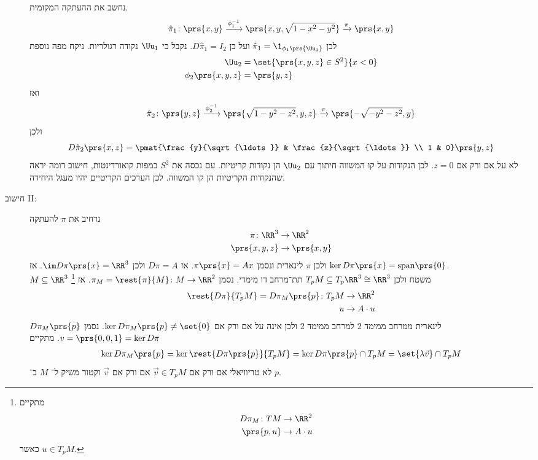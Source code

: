 \documentclass[a4paper,10pt,twoside,openany]{book}
\begin{document}
\begin{example}
\begin{description}
\begin{figure}[ht]
\caption{}
\label{project:shpere-plane-map}
\end{figure}
נחשב את ההעתקה המקומית.
\begin{align*}
\hat{\pi}_1 \colon \prs{x,y} \xrightarrow{\phi_1^{-1}} \prs{x,y,\sqrt{1-x^2-y^2}} \xrightarrow{\pi} \prs{x,y}
\end{align*}
לכן
$\hat{\pi}_1 = \1_{\phi_1\prs{\Uu_1}}$
ועל כן
$D\hat{\pi}_1 = I_2$.
נקבל כי
$\Uu_1$
נקודה רגולריות.
ניקח מפה נוספת
\begin{align*}
\Uu_2 &= \set{\prs{x,y,z}\in S^2}{x < 0} \\
\phi_2\prs{x,y,z} &= \prs{y,z}
\end{align*}
ואז
\[\hat{\pi}_2 \colon \prs{y,z} \xrightarrow{\phi_2^{-1}}\prs{\sqrt{1-y^2-z^2},y,z} \xrightarrow{\pi} \prs{-\sqrt{-y^2-z^2},y}\]
ולכן
\[D\hat{\pi}_2\prs{x,z} = \pmat{\frac{y}{\sqrt{\ldots}} & \frac{z}{\sqrt{\ldots}} \\ 1 & 0}\prs{y,z}\]
לא על אם ורק אם
$z=0$.
לכן הנקודות על קו המשווה חיתוך עם
$\Uu_2$
הן נקודות קריטיות.
עם נכסה את
$S^2$
במפות קואורדינטות, חישוב דומה יראה שהנקודות הקריטיות הן קו המשווה.
לכן הערכים הקריטיים יהיו מעגל היחידה.
\item[חישוב \textenglish{II}:]
נרחיב את
$\pi$
להעתקה
\begin{align*}
\pi \colon \RR^3 &\to \RR^2 \\
\prs{x,y,z} &\to \prs{x,y}
\end{align*}
ולכן
$\pi$
לינארית ונסמן
$\pi\prs{x} = Ax$.
אז
$D\pi = A$
ולכן
$\im D\pi\prs{x} = \RR^3$.
אז
$\ker D\pi\prs{x} = \mathrm{span}\prs{0}$.\\
$M \subseteq \RR^3$
משטח ולכן
$T_p M \subseteq T_p \RR^3 \cong \RR^3$
תת־מרחב דו מימדי.
נסמן
$\pi_M = \rest{\pi}{M} \colon M \to \RR^2$.
אז%
\footnote{מתקיים \begin{align*}
D\pi_M \colon TM &\to \RR^2 \\ \prs{p,u} &\to A\cdot u
\end{align*}
כאשר
$u \in T_pM$.}
\begin{align*}
\rest{D\pi}{T_p M} = D \pi_M\prs{p} \colon T_p M &\to \RR^2 \\
u &\to A\cdot u
\end{align*}
$D\pi_M\prs{p}$
לינארית ממרחב ממימד 2 למרחב ממימד 2 ולכן אינה על אם ורק אם
$\ker D\pi_M\prs{p} \neq \set{0}$.
נסמן
$v = \prs{0,0,1} = \ker D\pi$.
מתקיים
\begin{align*}
\ker D\pi_M\prs{p} = \ker \rest{D\pi\prs{p}}{T_pM} = \ker D\pi\prs{p} \cap T_p M = \set{\lambda \vec{v}}\cap T_p M
\end{align*}
לא טריוויאלי אם ורק אם
$\vec{v} \in T_p M$
אם ורק אם
$\vec{v}$
וקטור משיק ל־%
$M$
ב־%
$p$.
\end{description}
\end{example}
\end{document}
